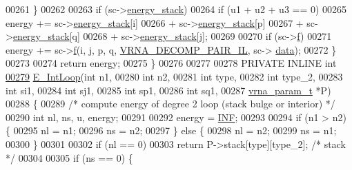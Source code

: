 \begin{DoxyCode}
00261     \}
00262 
00263     \textcolor{keywordflow}{if} (sc->\hyperlink{group__soft__constraints_ac20dded6068e81acd0f1139092f66a22}{energy\_stack})
00264       \textcolor{keywordflow}{if} (u1 + u2 + u3 == 0)
00265         energy += sc->\hyperlink{group__soft__constraints_ac20dded6068e81acd0f1139092f66a22}{energy\_stack}[i]
00266                   + sc->\hyperlink{group__soft__constraints_ac20dded6068e81acd0f1139092f66a22}{energy\_stack}[p]
00267                   + sc->\hyperlink{group__soft__constraints_ac20dded6068e81acd0f1139092f66a22}{energy\_stack}[q]
00268                   + sc->\hyperlink{group__soft__constraints_ac20dded6068e81acd0f1139092f66a22}{energy\_stack}[j];
00269 
00270     \textcolor{keywordflow}{if} (sc->\hyperlink{group__soft__constraints_a32dc86090237888c75491bbd4861a04b}{f})
00271       energy += sc->\hyperlink{group__soft__constraints_a32dc86090237888c75491bbd4861a04b}{f}(i, j, p, q, \hyperlink{group__constraints_gaeab04f34d7730cff2d651d782f95d857}{VRNA\_DECOMP\_PAIR\_IL}, sc->
      \hyperlink{group__soft__constraints_a7574680143df97b9029146c2150bf06d}{data});
00272   \}
00273 
00274   \textcolor{keywordflow}{return} energy;
00275 \}
00276 
00277 
00278 PRIVATE INLINE \textcolor{keywordtype}{int}
\hyperlink{group__loops_gaafbc187b7f78e8e82afb77dd6f3b8fc5}{00279} \hyperlink{group__loops_gaafbc187b7f78e8e82afb77dd6f3b8fc5}{E\_IntLoop}(\textcolor{keywordtype}{int}           n1,
00280           \textcolor{keywordtype}{int}           n2,
00281           \textcolor{keywordtype}{int}           type,
00282           \textcolor{keywordtype}{int}           type\_2,
00283           \textcolor{keywordtype}{int}           si1,
00284           \textcolor{keywordtype}{int}           sj1,
00285           \textcolor{keywordtype}{int}           sp1,
00286           \textcolor{keywordtype}{int}           sq1,
00287           \hyperlink{group__energy__parameters_structvrna__param__s}{vrna\_param\_t}  *P)
00288 \{
00289   \textcolor{comment}{/* compute energy of degree 2 loop (stack bulge or interior) */}
00290   \textcolor{keywordtype}{int} nl, ns, u, energy;
00291 
00292   energy = \hyperlink{energy__const_8h_a12c2040f25d8e3a7b9e1c2024c618cb6}{INF};
00293 
00294   \textcolor{keywordflow}{if} (n1 > n2) \{
00295     nl  = n1;
00296     ns  = n2;
00297   \} \textcolor{keywordflow}{else} \{
00298     nl  = n2;
00299     ns  = n1;
00300   \}
00301 
00302   \textcolor{keywordflow}{if} (nl == 0)
00303     \textcolor{keywordflow}{return} P->stack[type][type\_2];  \textcolor{comment}{/* stack */}
00304 
00305   \textcolor{keywordflow}{if} (ns == 0) \{

\end{DoxyCode}
